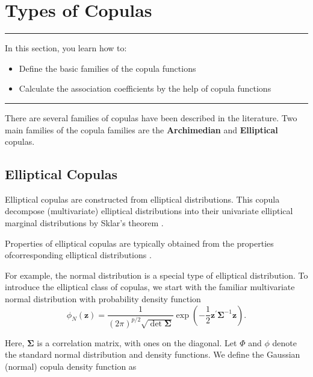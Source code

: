 \documentclass[]{book}
\providecommand{\tightlist}{%
  \setlength{\itemsep}{0pt}\setlength{\parskip}{0pt}}
\theoremstyle{definition}
\theoremstyle{definition}
\theoremstyle{definition}
\theoremstyle{remark}
\begin{document}
\section{Types of Copulas}\label{S:CopTyp}

\begin{center}\rule{0.5\linewidth}{\linethickness}\end{center}

In this section, you learn how to:

\begin{itemize}
\tightlist
\item
  Define the basic families of the copula functions
\item
  Calculate the association coefficients by the help of copula functions
\end{itemize}

\begin{center}\rule{0.5\linewidth}{\linethickness}\end{center}

There are several families of copulas have been described in the
literature. Two main families of the copula families are the
\textbf{Archimedian} and \textbf{Elliptical} copulas.

\subsection{Elliptical Copulas}\label{elliptical-copulas}

Elliptical copulas are constructed from elliptical distributions. This
copula decompose (multivariate) elliptical distributions into their
univariate elliptical marginal distributions by Sklar's theorem
\citep{hofertelements}.

Properties of elliptical copulas are typically obtained from the
properties ofcorresponding elliptical distributions
\citep{hofertelements}.

For example, the normal distribution is a special type of elliptical
distribution. To introduce the elliptical class of copulas, we start
with the familiar multivariate normal distribution with probability
density function
\[\phi_N (\mathbf{z})= \frac{1}{(2 \pi)^{p/2}\sqrt{\det \boldsymbol \Sigma}}
\exp\left( -\frac{1}{2} \mathbf{z}^{\prime} \boldsymbol
\Sigma^{-1}\mathbf{z}\right).\]

Here, \(\boldsymbol \Sigma\) is a correlation matrix, with ones on the
diagonal. Let \(\Phi\) and \(\phi\) denote the standard normal
distribution and density functions. We define the Gaussian (normal)
copula density function as
\end{document}
